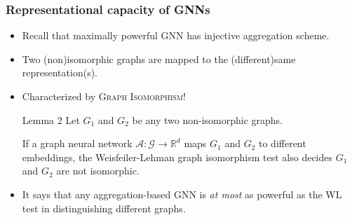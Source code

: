 \documentclass{beamer}
\begin{document}
\begin{frame}
\frametitle{Representational capacity of GNNs}

\begin{itemize}
	\item Recall that maximally powerful GNN has injective aggregation scheme. \pause
	
	\item Two (non)isomorphic graphs are mapped to the (different)same representation(s). \pause
	
	\item Characterized by \textsc{Graph Isomorphism}! \pause
	
	\begin{block}{Lemma 2}
Let $G_1$ and $G_2$ be any two non-isomorphic graphs.

If a graph neural network $\mathcal{A} : \mathcal{G} \rightarrow \mathbb{R}^d$ maps $G_1$ and $G_2$ to different embeddings, the Weisfeiler-Lehman graph isomorphism test also decides $G_1$ and $G_2$ are not isomorphic.
	\end{block} \pause

	\item It says that any aggregation-based GNN is {\it at most} as powerful as the WL test in distinguishing different graphs.
\end{itemize}

\end{frame}
\end{document}
